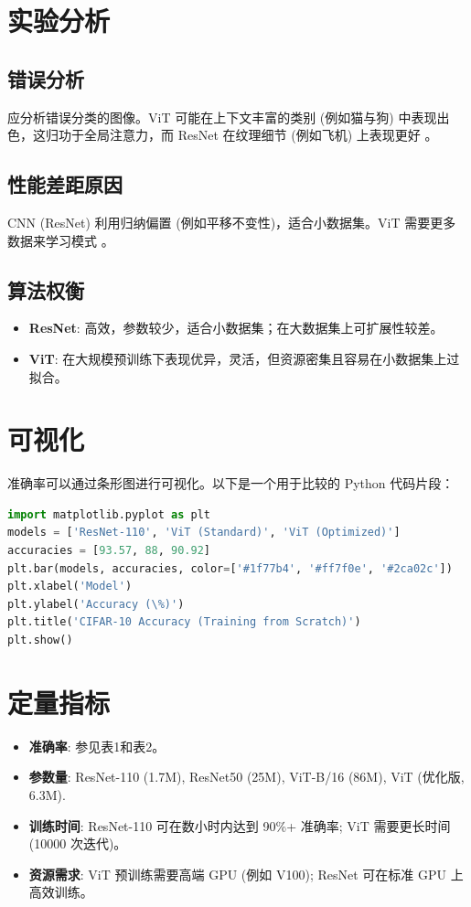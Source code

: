 \documentclass[UTF8]{report}
\theoremstyle{MyLineTheoremStyle} %
\theoremstyle{MyBlockTheoremStyle} %
\theoremstyle{MySubsubsectionStyle} %
\begin{document}
\section*{实验分析}
\subsection*{错误分析}
应分析错误分类的图像。ViT 可能在上下文丰富的类别 (例如猫与狗) 中表现出色，这归功于全局注意力，而 ResNet 在纹理细节 (例如飞机) 上表现更好 \cite{kentaroy47vit}。

\subsection*{性能差距原因}
CNN (ResNet) 利用归纳偏置 (例如平移不变性)，适合小数据集。ViT 需要更多数据来学习模式 \cite{lightningvit}。

\subsection*{算法权衡}
\begin{itemize}
    \item \textbf{ResNet}: 高效，参数较少，适合小数据集；在大数据集上可扩展性较差。
    \item \textbf{ViT}: 在大规模预训练下表现优异，灵活，但资源密集且容易在小数据集上过拟合。
\end{itemize}

\section*{可视化}
准确率可以通过条形图进行可视化。以下是一个用于比较的 Python 代码片段：

\begin{lstlisting}[language=Python]
import matplotlib.pyplot as plt
models = ['ResNet-110', 'ViT (Standard)', 'ViT (Optimized)']
accuracies = [93.57, 88, 90.92]
plt.bar(models, accuracies, color=['#1f77b4', '#ff7f0e', '#2ca02c'])
plt.xlabel('Model')
plt.ylabel('Accuracy (\%)')
plt.title('CIFAR-10 Accuracy (Training from Scratch)')
plt.show()
\end{lstlisting}

\section*{定量指标}
\begin{itemize}
    \item \textbf{准确率}: 参见表1和表2。
    \item \textbf{参数量}: ResNet-110 (1.7M), ResNet50 (25M), ViT-B/16 (86M), ViT (优化版, 6.3M).
    \item \textbf{训练时间}: ResNet-110 可在数小时内达到 90\%+ 准确率; ViT 需要更长时间 (10000 次迭代)。
    \item \textbf{资源需求}: ViT 预训练需要高端 GPU (例如 V100); ResNet 可在标准 GPU 上高效训练。
\end{itemize}
\end{document}
